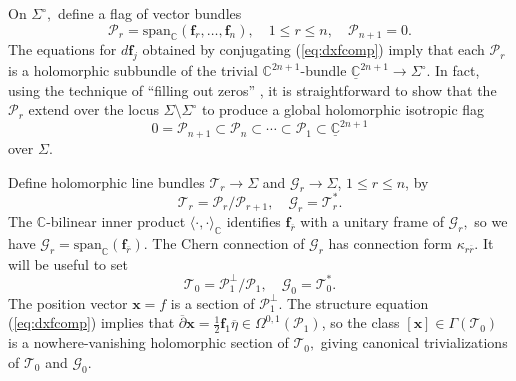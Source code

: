 \documentclass[11pt]{article}
\theoremstyle{definition}
\newcommand{\C}{\mathbb{C}}
\newcommand{\delbar}{\overline{\partial}}
\numberwithin{equation}{section}
\begin{document}
\indent \indent On $\Sigma^{\circ},$ define a flag of vector bundles
\begin{equation*}
	\mathcal{P}_r = \mathrm{span}_\C(\mathbf{f}_r, \ldots, \mathbf{f}_n), \quad 1 \leq r \leq n, \quad \mathcal{P}_{n+1} = 0.
\end{equation*}
The equations for $d \mathbf{f}_j$ obtained by conjugating (\ref{eq:dxfcomp}) imply that each $\mathcal{P}_r$ is a holomorphic subbundle of the trivial $\C^{2n+1}$-bundle $\underline{\C}^{2n+1} \to \Sigma^\circ.$ In fact, using the technique of ``filling out zeros'' \cite[Prop. 2.2]{BursWood86}, it is straightforward to show that the $\mathcal{P}_r$ extend over the locus $\Sigma \setminus \Sigma^{\circ}$ to produce a global holomorphic isotropic flag
\begin{equation}\label{eq:holomflag}
	0 = \mathcal{P}_{n+1} \subset \mathcal{P}_n \subset \cdots \subset \mathcal{P}_1 \subset \underline{\C}^{2n+1}
\end{equation}
over $\Sigma.$

Define holomorphic line bundles $\mathcal{T}_r \to \Sigma$ and $\mathcal{G}_r \to \Sigma$, $1 \leq r \leq n$, by
\begin{equation*}
	\mathcal{T}_r = \mathcal{P}_r / \mathcal{P}_{r+1}, \quad \mathcal{G}_r = \mathcal{T}_r^*.
\end{equation*}
The $\C$-bilinear inner product $\langle \cdot, \cdot \rangle_\C$ identifies $\mathbf{f}_{\overline{r}}$ with a unitary frame of $\mathcal{G}_r,$ so we have $\mathcal{G}_r = \mathrm{span}_\C(\mathbf{f}_{\overline{r}})$. The Chern connection of $\mathcal{G}_r$ has connection form $\kappa_{r \overline{r}}$. It will be useful to set
\begin{equation*}
	\mathcal{T}_0 = \mathcal{P}_1^\perp / \mathcal{P}_1, \quad \mathcal{G}_0 = \mathcal{T}_0^*.
\end{equation*}
The position vector $\mathbf{x} = f$ is a section of $\mathcal{P}_1^\perp.$ The structure equation (\ref{eq:dxfcomp}) implies that $\delbar \mathbf{x} = \tfrac{1}{2} \mathbf{f}_1 \overline{\eta} \in \Omega^{0,1}(\mathcal{P}_1)$, so the class $\left[ \mathbf{x} \right] \in \Gamma(\mathcal{T}_0)$ is a nowhere-vanishing holomorphic section of $\mathcal{T}_0,$ giving canonical trivializations of $\mathcal{T}_0$ and $\mathcal{G}_0.$
\end{document}

